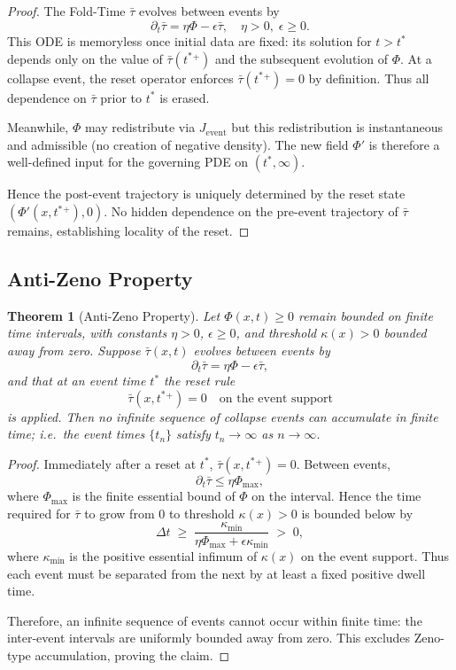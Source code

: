 \documentclass[11pt]{article}
\newtheorem{theorem}{Theorem}[section]
\begin{document}
\begin{proof}
The Fold-Time $\bar{\tau}$ evolves between events by
\[
\partial_t \bar{\tau} = \eta \Phi - \epsilon \bar{\tau}, 
\quad \eta > 0,\;\epsilon \geq 0.
\]
This ODE is memoryless once initial data are fixed: its solution 
for $t > t^\ast$ depends only on the value of $\bar{\tau}(t^\ast{}^+)$ 
and the subsequent evolution of $\Phi$. At a collapse event, the reset 
operator enforces $\bar{\tau}(t^\ast{}^+) = 0$ by definition. 
Thus all dependence on $\bar{\tau}$ prior to $t^\ast$ is erased.

Meanwhile, $\Phi$ may redistribute via $J_{\text{event}}$ but this 
redistribution is instantaneous and admissible (no creation of negative 
density). The new field $\Phi'$ is therefore a well-defined input for 
the governing PDE on $(t^\ast,\infty)$.

Hence the post-event trajectory is uniquely determined by the reset 
state $(\Phi'(x,t^\ast{}^+),0)$. No hidden dependence on the pre-event 
trajectory of $\bar{\tau}$ remains, establishing locality of the reset.
\end{proof}

\subsection{Anti-Zeno Property}

\begin{theorem}[Anti-Zeno Property]
Let $\Phi(x,t) \geq 0$ remain bounded on finite time intervals, 
with constants $\eta > 0$, $\epsilon \geq 0$, and threshold $\kappa(x) > 0$ 
bounded away from zero. Suppose $\bar{\tau}(x,t)$ evolves between events by
\[
\partial_t \bar{\tau} = \eta \Phi - \epsilon \bar{\tau},
\]
and that at an event time $t^\ast$ the reset rule
\[
\bar{\tau}(x,t^\ast{}^+) = 0 \quad \text{on the event support}
\]
is applied. Then no infinite sequence of collapse events can accumulate in 
finite time; i.e.\ the event times $\{t_n\}$ satisfy $t_n \to \infty$ as $n \to \infty$.
\end{theorem}

\begin{proof}
Immediately after a reset at $t^\ast$, $\bar{\tau}(x,t^\ast{}^+) = 0$. 
Between events,
\[
\partial_t \bar{\tau} \leq \eta \Phi_{\max},
\]
where $\Phi_{\max}$ is the finite essential bound of $\Phi$ on the interval.
Hence the time required for $\bar{\tau}$ to grow from $0$ to threshold 
$\kappa(x) > 0$ is bounded below by
\[
\Delta t \;\geq\; \frac{\kappa_{\min}}{\eta \Phi_{\max} + \epsilon \kappa_{\min}} 
\;>\; 0,
\]
where $\kappa_{\min}$ is the positive essential infimum of $\kappa(x)$ 
on the event support. Thus each event must be separated from the next 
by at least a fixed positive dwell time.

Therefore, an infinite sequence of events cannot occur within finite 
time: the inter-event intervals are uniformly bounded away from zero. 
This excludes Zeno-type accumulation, proving the claim.
\end{proof}
\end{document}
